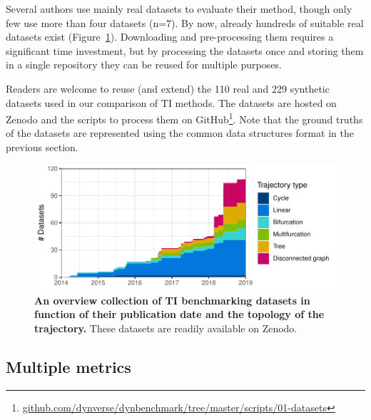 Several authors use mainly real datasets to evaluate their method, though only few use more than four datasets (n=7). 
By now, already hundreds of suitable real datasets exist (Figure~\ref{fig:datasets}). Downloading and pre-processing them requires a significant time investment, but by processing the datasets once and storing them in a single repository they can be reused for multiple purposes.

Readers are welcome to reuse (and extend) the 110 real and 229 synthetic datasets used in our comparison of TI methods. The datasets are hosted on Zenodo\cite{cannoodt_singlecellomicsdatasets_2018} and the scripts to process them on GitHub\footnote{\href{https://github.com/dynverse/dynbenchmark/tree/master/scripts/01-datasets}{github.com/dynverse/dynbenchmark/tree/master/scripts/01-datasets}}. Note that the ground truths of the datasets are represented using the common data structures format in the previous section.

\begin{figure}[htb!]
	\centering
	\includegraphics[width=.75\linewidth]{fig/datasets.pdf} 
	\caption{\textbf{An overview collection of TI benchmarking datasets in function of their publication date and the topology of the trajectory.} These datasets are readily available on Zenodo\cite{cannoodt_singlecellomicsdatasets_2018}.}
	\label{fig:datasets}
\end{figure}


\subsection{Multiple metrics}



